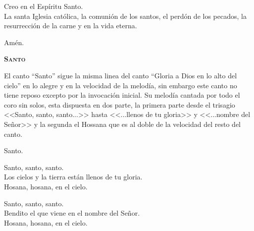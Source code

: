 \documentclass[12pt, letterpaper]{report}
\begin{document}
    \noindent
    Creo en el Esp\'iritu Santo. \\
    La santa Iglesia cat\'olica, la comuni\'on de los santos, el perd\'on de los pecados, la resurrecci\'on de la carne y en la vida eterna.

    \noindent
    Am\'en.
    \clearpage





    \begin{center}
        {\scshape \Huge {\bfseries Santo}}
    \end{center}

    \Large El canto ``Santo'' sigue la misma linea del canto “Gloria a Dios en lo alto del cielo”
    en lo alegre y en la velocidad de la melod\'ia, sin embargo este canto no tiene reposo excepto
    por la invocaci\'on inicial. Su melod\'ia cantada por todo el coro sin solos, esta dispuesta en
    dos parte, la primera parte desde el trisagio <<Santo, santo, santo...>> hasta
    <<...llenos de tu gloria>> y <<...nombre del Se\~nor>> y la segunda el Hossana que es al doble
    de la velocidad del resto del canto.

    \noindent
    \LARGE Santo.

    \noindent
    Santo, santo, santo. \\
    Los cielos y la tierra est\'an llenos de tu gloria.\\
    Hosana, hosana, en el cielo.

    \noindent
    Santo, santo, santo. \\
    Bendito el que viene en el nombre del Se\~nor. \\
    Hosana, hosana, en el cielo.
    \clearpage

\end{document}
